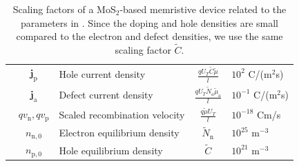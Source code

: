 \documentclass[10pt,a4paper, final]{article}
\def\electrons{\text{n}}
\def\holes{\text{p}}
\def\ions{\text{a}}
\theoremstyle{definition}								%
\numberwithin{equation}{section}
\numberwithin{figure}{section}
\numberwithin{theorem}{section}
\begin{document}
\begin{table}[!ht]
{\begin{tabular}{|c|l|c|l|}
            ~
            $\mathbf{j}_\holes$ & Hole current density & $\displaystyle\frac{q U_T \tilde{C} \tilde{\mu}}{l}$&  $10^{2}$ C/(m$^2$s)\\[2.0ex]
            ~
            $\mathbf{j}_\ions$ & Defect current density & $\displaystyle\frac{q U_T \tilde{N}_\ions\tilde{\mu}_\ions}{l}$&  $10^{-1}$ C/(m$^2$s)\\[2.0ex]
            ~
            $q v_\electrons, q v_\holes$ & Scaled recombination velocity & $\displaystyle\frac{q \tilde{\mu}U_T}{l}$&  $10^{-18}$ Cm/s\\[2.0ex]
            ~
            $n_{\electrons, 0}$ & Electron equilibrium density & $\tilde{N}_\electrons$ & $10^{25}$ m$^{-3}$\\[2.0ex]
            ~
            $n_{\holes, 0}$ & Hole equilibrium density & $\tilde{C}$ & $10^{21}$ m$^{-3}$\\[2.0ex]
            \hline
    \end{tabular}
    }
    \caption{
        Scaling factors of a MoS$_2$-based memristive device related to the parameters in .
        Since the doping and hole densities are small compared to the electron and defect densities, we use the same scaling factor $\tilde{C}$.
        }
    \label{tab:scalingfactors-memristors}
\end{table}
\end{document}

